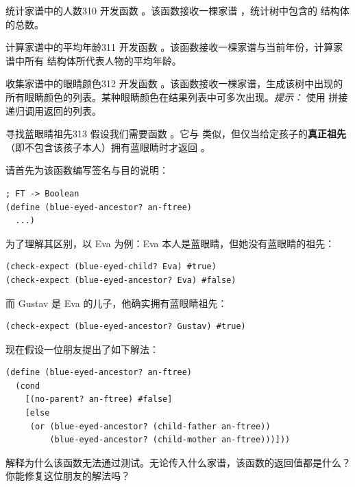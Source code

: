 \begin{exercise}{统计家谱中的人数}{310}
开发函数 。该函数接收一棵家谱 ，统计树中包含的  结构体的总数。
\end{exercise}

\begin{exercise}{计算家谱中的平均年龄}{311}
开发函数 。该函数接收一棵家谱与当前年份，计算家谱中所有  结构体所代表人物的平均年龄。
\end{exercise}

\begin{exercise}{收集家谱中的眼睛颜色}{312}
开发函数 。该函数接收一棵家谱，生成该树中出现的所有眼睛颜色的列表。某种眼睛颜色在结果列表中可多次出现。\emph{提示：} 使用  拼接递归调用返回的列表。
\end{exercise}

\begin{exercise}{寻找蓝眼睛祖先}{313}
假设我们需要函数 。它与  类似，但仅当给定孩子的\textbf{真正祖先}（即不包含该孩子本人）拥有蓝眼睛时才返回 。

请首先为该函数编写签名与目的说明：
\begin{lstlisting}[language=BSL]
; FT -> Boolean
(define (blue-eyed-ancestor? an-ftree)
  ...)
\end{lstlisting}

为了理解其区别，以 Eva 为例：Eva 本人是蓝眼睛，但她没有蓝眼睛的祖先：
\begin{lstlisting}[language=BSL]
(check-expect (blue-eyed-child? Eva) #true)
(check-expect (blue-eyed-ancestor? Eva) #false)
\end{lstlisting}
而 Gustav 是 Eva 的儿子，他确实拥有蓝眼睛祖先：
\begin{lstlisting}[language=BSL]
(check-expect (blue-eyed-ancestor? Gustav) #true)
\end{lstlisting}

现在假设一位朋友提出了如下解法：
\begin{lstlisting}[language=BSL]
(define (blue-eyed-ancestor? an-ftree)
  (cond
    [(no-parent? an-ftree) #false]
    [else
     (or (blue-eyed-ancestor? (child-father an-ftree))
         (blue-eyed-ancestor? (child-mother an-ftree)))]))
\end{lstlisting}
解释为什么该函数无法通过测试。无论传入什么家谱，该函数的返回值都是什么？你能修复这位朋友的解法吗？
\end{exercise}

